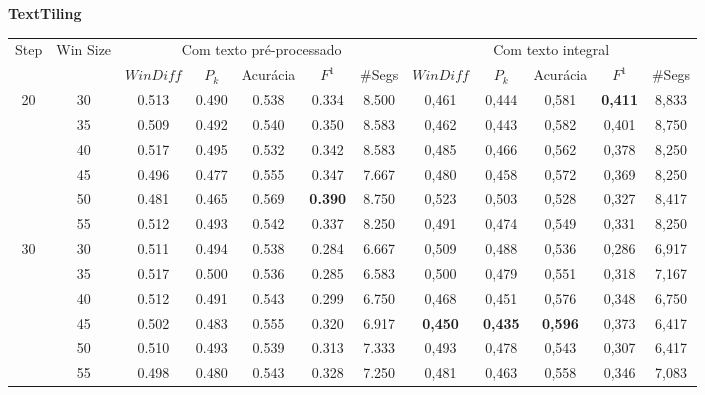 
\begin{table}[!h]
\tiny \center
\textbf{TextTiling} \\ 
	\begin{tabular}{|c|c||c|c|c|c|c||c|c|c|c|c|}
\hline 
\multirow{2}{*}{Step} & \multirow{2}{*}{Win Size}
  & \multicolumn{5}{c||}{Com texto pré-processado} & \multicolumn{5}{|c|}{Com texto integral}\\\cline{3-12} 
&& $WinDiff$ & $P_k$ & Acurácia & $F^1$ & \#Segs &  $WinDiff$ & $P_k$ & Acurácia & $F^1$ & \#Segs\\ \hline 
 \multirow{6}{*}{20} 
  & 30 & 0.513 & 0.490 & 0.538 & 0.334  & 8.500                 & 0,461 & 0,444 & 0,581 & \cellcolor{gray!20} \textbf{0,411} & 8,833  \\ \cline{2-12} 
  & 35 & 0.509 & 0.492 & 0.540 & 0.350  & 8.583                 & 0,462 & 0,443 & 0,582 & 0,401 & 8,750  \\  \cline{2-12}
  & 40 & 0.517 & 0.495 & 0.532 & 0.342  & 8.583                 & 0,485 & 0,466 & 0,562 & 0,378 & 8,250  \\  \cline{2-12}
  & 45 & 0.496 & 0.477 & 0.555 & 0.347  & 7.667                 & 0,480 & 0,458 & 0,572 & 0,369 & 8,250  \\  \cline{2-12}
  & 50 & 0.481 & 0.465 & 0.569 & \cellcolor{gray!20} \textbf{0.390} & 8.750  & 0,523 & 0,503 & 0,528 & 0,327 & 8,417  \\  \cline{2-12}
  & 55 & 0.512 & 0.493 & 0.542 & 0.337  & 8.250  & 0,491 & 0,474 & 0,549 & 0,331 & 8,250  \\ \hline      
 \multirow{6}{*}{30} 
  & 30 & 0.511 & 0.494 & 0.538 & 0.284  & 6.667                & 0,509 & 0,488 & 0,536 & 0,286 & 6,917  \\ \cline{2-12}    
  & 35 & 0.517 & 0.500 & 0.536 & 0.285  & 6.583                & 0,500 & 0,479 & 0,551 & 0,318 & 7,167  \\ \cline{2-12}         
  & 40 & 0.512 & 0.491 & 0.543 & 0.299  & 6.750                & 0,468 & 0,451 & 0,576 & 0,348 & 6,750  \\ \cline{2-12} 
  & 45 & 0.502 & 0.483 & 0.555 & 0.320  & 6.917                & \cellcolor{gray!20} \textbf{0,450} & \cellcolor{gray!20} \textbf{0,435} & \cellcolor{gray!20} \textbf{0,596} & 0,373 & 6,417  \\  \cline{2-12} 
  & 50 & 0.510 & 0.493 & 0.539 & 0.313  & 7.333                & 0,493 & 0,478 & 0,543 & 0,307 & 6,417  \\ \cline{2-12}                
  & 55 & 0.498 & 0.480 & 0.543 & 0.328  & 7.250                & 0,481 & 0,463 & 0,558 & 0,346 & 7,083  \\ \hline     

\end{tabular}
\end{table}
